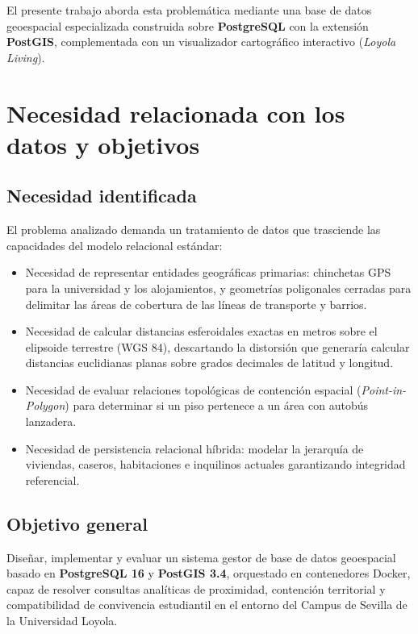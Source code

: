 \documentclass[a4paper,12pt]{article}
\begin{document}
El presente trabajo aborda esta problemática mediante una base de datos geoespacial especializada construida sobre \textbf{PostgreSQL} con la extensión \textbf{PostGIS}, complementada con un visualizador cartográfico interactivo (\textit{Loyola Living}).

\section{Necesidad relacionada con los datos y objetivos}

\subsection{Necesidad identificada}
El problema analizado demanda un tratamiento de datos que trasciende las capacidades del modelo relacional estándar:
\begin{itemize}[leftmargin=1.0cm]
  \item Necesidad de representar entidades geográficas primarias: chinchetas GPS para la universidad y los alojamientos, y geometrías poligonales cerradas para delimitar las áreas de cobertura de las líneas de transporte y barrios.
  \item Necesidad de calcular distancias esferoidales exactas en metros sobre el elipsoide terrestre (WGS 84), descartando la distorsión que generaría calcular distancias euclidianas planas sobre grados decimales de latitud y longitud.
  \item Necesidad de evaluar relaciones topológicas de contención espacial (\textit{Point-in-Polygon}) para determinar si un piso pertenece a un área con autobús lanzadera.
  \item Necesidad de persistencia relacional híbrida: modelar la jerarquía de viviendas, caseros, habitaciones e inquilinos actuales garantizando integridad referencial.
\end{itemize}

\subsection{Objetivo general}
Diseñar, implementar y evaluar un sistema gestor de base de datos geoespacial basado en \textbf{PostgreSQL 16} y \textbf{PostGIS 3.4}, orquestado en contenedores Docker, capaz de resolver consultas analíticas de proximidad, contención territorial y compatibilidad de convivencia estudiantil en el entorno del Campus de Sevilla de la Universidad Loyola.
\end{document}
